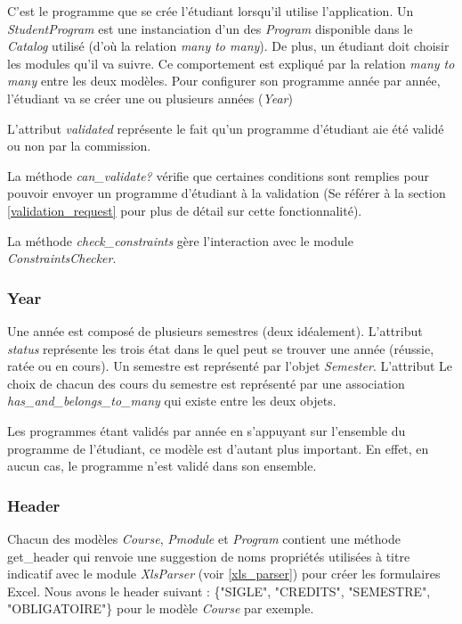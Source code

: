 C'est le programme que se crée l'étudiant lorsqu'il utilise l'application. Un \textit{StudentProgram} est une instanciation d'un des \textit{Program} disponible dans le \textit{Catalog} utilisé (d'où la relation \textit{many to many}). De plus, un étudiant doit choisir les modules qu'il va suivre. Ce comportement est expliqué par la relation \textit{many to many} entre les deux modèles. Pour configurer son programme année par année, l'étudiant va se créer une ou plusieurs années (\textit{Year})

L'attribut \textit{validated} représente le fait qu'un programme d'étudiant aie été validé ou non par la commission.

La méthode \textit{can\_validate?} vérifie que certaines conditions sont remplies pour pouvoir envoyer un programme d'étudiant à la validation (Se référer à la section \ref{validation_request} pour plus de détail sur cette fonctionnalité).

La méthode \textit{check\_constraints} gère l’interaction avec le module \textit{ConstraintsChecker}. 

\subsubsection{Year}

Une année est composé de plusieurs semestres (deux idéalement). L'attribut \textit{status} représente les trois état dans le quel peut se trouver une année (réussie, ratée ou en cours). Un semestre est représenté par l'objet \textit{Semester}. L'attribut Le choix de chacun des cours du semestre est représenté par une association \textit{has\_and\_belongs\_to\_many} qui existe entre les deux objets.

Les programmes étant validés par année en s'appuyant sur l'ensemble du programme de l'étudiant, ce modèle est d'autant plus important. En effet, en aucun cas, le programme n'est validé dans son ensemble. 

\subsubsection{Header}

Chacun des modèles \textit{Course}, \textit{Pmodule} et \textit{Program} contient une méthode get\_header qui renvoie une suggestion de noms propriétés utilisées à titre indicatif avec le module \textit{XlsParser} (voir \ref{xls_parser}) pour créer les formulaires Excel. Nous avons le header suivant : \{"SIGLE", "CREDITS", "SEMESTRE", "OBLIGATOIRE"\} pour le modèle \textit{Course} par exemple.

